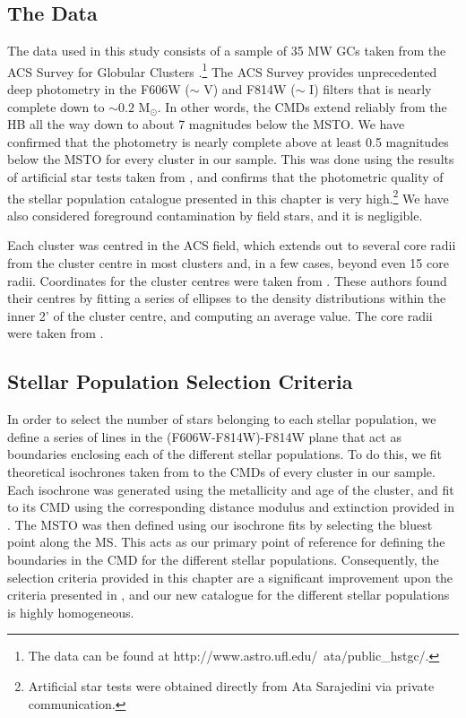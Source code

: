 \subsection{The Data} \label{data4}

The data used in this study consists of a sample of 35 MW GCs taken
from the ACS Survey for Globular Clusters \citep{sarajedini07}.\footnote[1]{The
data can be found at http://www.astro.ufl.edu/~ata/public\_hstgc/.}  The
ACS Survey provides unprecedented deep photometry in the F606W ($\sim$
V) and F814W ($\sim$ I) filters 
that is nearly complete down to $\sim 0.2$ M$_{\odot}$.  In other
words, the 
CMDs extend reliably from the HB all the way down to about 7
magnitudes below the MSTO.  We have confirmed that
the photometry is nearly complete above at least 0.5
magnitudes below the MSTO for every cluster in our sample.  This was
done using the results of artificial star tests taken from  
\citet{anderson08}, and confirms that the photometric quality of
the stellar population catalogue presented in this chapter is very
high.\footnote[2]{Artificial star tests were obtained directly from Ata
Sarajedini via private communication.}  We have also considered
foreground contamination by field stars, and it is negligible.

Each cluster was centred in the ACS field, which
extends out to several core radii from the cluster 
centre in most clusters and, in a few cases, beyond even 15 core
radii.  Coordinates for the cluster centres were taken from 
\citet{goldsbury10}.  These authors found their centres by fitting
a series of ellipses to the density distributions within the inner 2'
of the cluster centre, and computing an average value.  The core
radii were taken from \citet{harris96}.

\subsection{Stellar Population Selection Criteria} \label{criteria4}

In order to select the number of stars belonging to each stellar
population, we define a series of lines in the (F606W-F814W)-F814W
plane that act as boundaries enclosing each of the different stellar
populations.  
To do this, we fit theoretical isochrones taken from \citet{dotter07}
to the CMDs of every cluster in our sample.  Each isochrone
was generated using the metallicity and age of the cluster, and fit to
its CMD using the corresponding distance modulus and extinction
provided in \citet{dotter10}.  
The MSTO was then defined using our isochrone fits by selecting the
bluest point along the MS.  This acts as our primary point of
reference for defining the boundaries in the CMD for the different
stellar populations.  Consequently, the selection criteria
provided in this chapter are a significant improvement upon the criteria
presented in \citet{leigh07}, and our new catalogue for the
different stellar populations is highly homogeneous.

